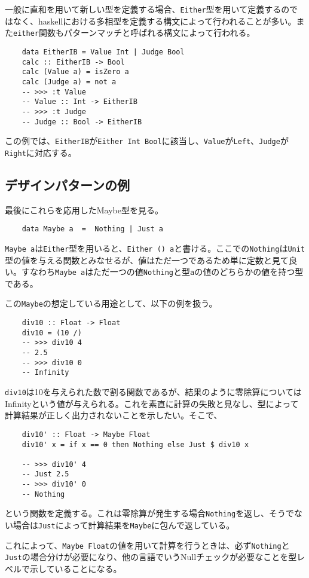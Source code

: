 \documentclass[uplatex,dvipdfmx]{jsarticle}
\newcommand{\pr}[1]{\colorbox[rgb]{0.9,0.9,0.9}{\lstinline{#1}}}
\begin{document}
  一般に直和を用いて新しい型を定義する場合、\pr{Either}型を用いて定義するのではなく、haskellにおける多相型を定義する構文によって行われることが多い。また\pr{either}関数もパターンマッチと呼ばれる構文によって行われる。

  \begin{lstlisting}
    data EitherIB = Value Int | Judge Bool
    calc :: EitherIB -> Bool
    calc (Value a) = isZero a
    calc (Judge a) = not a
    -- >>> :t Value
    -- Value :: Int -> EitherIB
    -- >>> :t Judge
    -- Judge :: Bool -> EitherIB
  \end{lstlisting}
  この例では、\pr{EitherIB}が\pr{Either Int Bool}に該当し、\pr{Value}が\pr{Left}、\pr{Judge}が\pr{Right}に対応する。
  \subsection{デザインパターンの例}
  最後にこれらを応用したMaybe型を見る。
  \begin{lstlisting}
    data Maybe a  =  Nothing | Just a
  \end{lstlisting}
  \pr{Maybe a}は\pr{Either}型を用いると、\pr{Either () a}と書ける。ここでの\pr{Nothing}は\pr{Unit}型の値を与える関数とみなせるが、値はただ一つであるため単に定数と見て良い。すなわち\pr{Maybe a}はただ一つの値\pr{Nothing}と型\pr{a}の値のどちらかの値を持つ型である。

  この\pr{Maybe}の想定している用途として、以下の例を扱う。
  \begin{lstlisting}
    div10 :: Float -> Float
    div10 = (10 /)
    -- >>> div10 4
    -- 2.5
    -- >>> div10 0
    -- Infinity
  \end{lstlisting}
  \pr{div10}は10を与えられた数で割る関数であるが、結果のように零除算についてはInfinityという値が与えられる。これを素直に計算の失敗と見なし、型によって計算結果が正しく出力されないことを示したい。そこで、
  \begin{lstlisting}
    div10' :: Float -> Maybe Float
    div10' x = if x == 0 then Nothing else Just $ div10 x

    -- >>> div10' 4
    -- Just 2.5
    -- >>> div10' 0
    -- Nothing
  \end{lstlisting}
  という関数を定義する。これは零除算が発生する場合\pr{Nothing}を返し、そうでない場合は\pr{Just}によって計算結果を\pr{Maybe}に包んで返している。

  これによって、\pr{Maybe Float}の値を用いて計算を行うときは、必ず\pr{Nothing}と\pr{Just}の場合分けが必要になり、他の言語でいうNullチェックが必要なことを型レベルで示していることになる。
\end{document}
